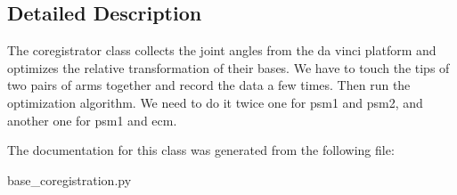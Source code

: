 \subsection{Detailed Description}
\begin{DoxyVerb}    The coregistrator class collects the joint angles from the da vinci platform and 
    optimizes the relative transformation of their bases. We have to touch the tips 
    of two pairs of arms together and record the data a few times. Then run the 
    optimization algorithm. We need to do it twice one for psm1 and psm2, and another
    one for psm1 and ecm.
\end{DoxyVerb}
 

The documentation for this class was generated from the following file\-:\begin{DoxyCompactItemize}
\item 
base\-\_\-coregistration.\-py\end{DoxyCompactItemize}
